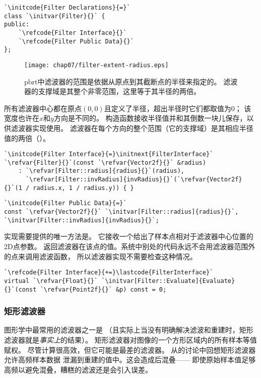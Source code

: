 \begin{lstlisting}
`\initcode{Filter Declarations}{=}`
class `\initvar{Filter}{}` {
public:
    `\refcode{Filter Interface}{}`
    `\refcode{Filter Public Data}{}`
};
\end{lstlisting}

\begin{figure}[htbp]
    \centering\texttt{[image: chap07/filter-extent-radius.eps]}
    \caption{pbrt中滤波器的范围是依据从原点到其截断点的半径来指定的。
        滤波器的支撑域是其整个非零范围，这里等于其半径的两倍。}
    \label{fig:7.40}
\end{figure}

所有滤波器中心都在原点$(0,0)$且定义了半径，超出半径时它们都取值为0；
该宽度也许在$x$和$y$方向是不同的。
构造函数接收半径值并和其倒数一块儿保存，以供滤波器实现使用。
滤波器在每个方向的整个范围（它的支撑域）是其相应半径值的两倍（）。
\begin{lstlisting}
`\initcode{Filter Interface}{=}\initnext{FilterInterface}`
`\refvar{Filter}{}`(const `\refvar{Vector2f}{}` &radius)
    : `\refvar[Filter::radius]{radius}{}`(radius),
      `\refvar[Filter::invRadius]{invRadius}{}`(`\refvar{Vector2f}{}`(1 / radius.x, 1 / radius.y)) { }
\end{lstlisting}
\begin{lstlisting}
`\initcode{Filter Public Data}{=}`
const `\refvar{Vector2f}{}` `\initvar[Filter::radius]{radius}{}`, `\initvar[Filter::invRadius]{invRadius}{}`;
\end{lstlisting}

实现需要提供的唯一方法是。
它接收一个给出了样本点相对于滤波器中心位置的2D点参数。
返回滤波器在该点的值。系统中别处的代码永远不会用滤波器范围外的点来调用滤波函数，
所以滤波器实现不需要检查这种情况。
\begin{lstlisting}
`\refcode{Filter Interface}{+=}\lastcode{FilterInterface}`
virtual `\refvar{Float}{}` `\initvar[Filter::Evaluate]{Evaluate}{}`(const `\refvar{Point2f}{}` &p) const = 0;
\end{lstlisting}

\subsubsection*{矩形滤波器}
图形学中最常用的滤波器之一是
（且实际上当没有明确解决滤波和重建时，矩形滤波器就是\emph{事实上}的结果）。
矩形滤波器对图像的一个方形区域内的所有样本等值赋权。
尽管计算很高效，但它可能是最差的滤波器。
从的讨论中回想矩形滤波器允许高频样本数据
泄漏到重建的值中。这会造成后混叠——
即使原始样本值足够高频以避免混叠，糟糕的滤波还是会引入误差。

